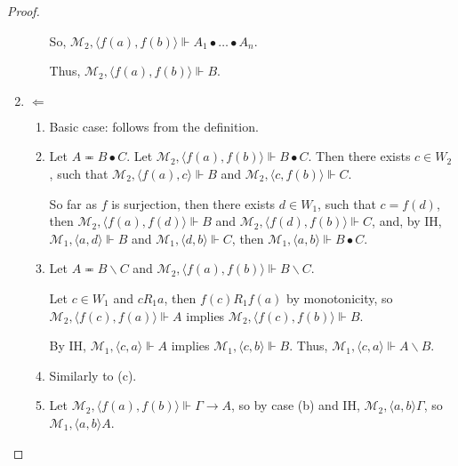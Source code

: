 \documentclass[a4paper]{article}
\theoremstyle{defin}
\theoremstyle{theorem}
\theoremstyle{prop}
\theoremstyle{lemma}
\theoremstyle{ex}
\theoremstyle{col}
\begin{document}
\begin{proof}
\begin{enumerate}
\begin{enumerate}
        So, $\mathcal{M}_2, \langle f(a), f(b) \rangle \Vdash A_1 \bullet \dots \bullet A_n$.

        Thus, $\mathcal{M}_2, \langle f(a), f(b) \rangle \Vdash B$.
      \end{enumerate}
    \item $\Leftarrow$
    \begin{enumerate}
      \item Basic case: follows from the definition.

      \item Let $A \eqcirc B \bullet C$.
      Let $\mathcal{M}_2, \langle f(a), f(b) \rangle \Vdash B \bullet C$. Then
      there exists $c \in W_2$, such that $\mathcal{M}_2, \langle f(a), c \rangle \Vdash B$ and
      $\mathcal{M}_2, \langle c, f(b) \rangle \Vdash C$.

      So far as $f$ is surjection, then there exists $d \in W_1$, such that
      $c = f(d)$, then $\mathcal{M}_2, \langle f(a), f(d) \rangle \Vdash B$ and
      $\mathcal{M}_2, \langle f(d), f(b) \rangle \Vdash C$, and, by IH,
      $\mathcal{M}_1, \langle a, d \rangle \Vdash B$ and $\mathcal{M}_1, \langle d, b \rangle \Vdash C$,
      then $\mathcal{M}_1, \langle a, b \rangle \Vdash B \bullet C$.

      \item Let $A \eqcirc B \backslash C$ and $\mathcal{M}_2, \langle f(a), f(b) \rangle \Vdash B \backslash C$.

      Let $c \in W_1$ and $c R_1 a$, then $f(c) R_1 f(a)$ by monotonicity,
      so $\mathcal{M}_2, \langle f(c), f(a) \rangle \Vdash A$ implies
      $\mathcal{M}_2, \langle f(c), f(b) \rangle \Vdash B$.

      By IH, $\mathcal{M}_1, \langle c, a \rangle \Vdash A$ implies
      $\mathcal{M}_1, \langle c, b \rangle \Vdash B$. Thus, $\mathcal{M}_1, \langle c, a \rangle \Vdash A \backslash B$.
      \item Similarly to (c).
      \item Let $\mathcal{M}_2, \langle f(a), f(b) \rangle \Vdash \Gamma \rightarrow A$, so
      by case (b) and IH, $\mathcal{M}_2, \langle a, b \rangle \Gamma$, so $\mathcal{M_1}, \langle a, b \rangle A$.
    \end{enumerate}
  \end{enumerate}
\end{proof}
\end{document}
